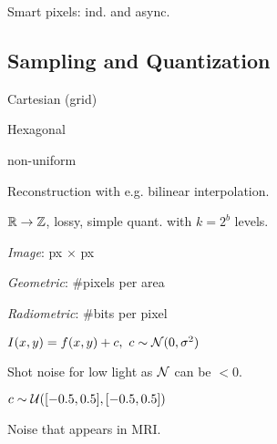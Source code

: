 \begin{definition}
  Smart pixels: ind. and async.
\end{definition}

\subsection{Sampling and Quantization}
\begin{definition}[Sampling]
  \begin{itemize*}
    \item Cartesian (grid)
    \item Hexagonal
    \item non-uniform
  \end{itemize*}

  Reconstruction with e.g. bilinear interpolation.
\end{definition}

\begin{definition}[Quantization]
  \(\operatorname{\mathbb{R}} \to \operatorname{\mathbb{Z}}\), lossy, simple quant. with \(k = 2^b\) levels.
\end{definition}

\begin{definition}[Resolutions]
  \begin{itemize*}
    \item \textit{Image}: px \(\times\) px
    \item \textit{Geometric}: \#pixels per area
    \item \textit{Radiometric}: \#bits per pixel
  \end{itemize*}
\end{definition}

\begin{definition}
  \(I(x, y) = f(x, y) + c, \ c \sim \operatorname{\mathcal{N}}(0, \sigma^2)\)
\end{definition}

\begin{definition}
  Shot noise for low light as \(\operatorname{\mathcal{N}}\) can be \(< 0\).
\end{definition}

\begin{definition}
  \(c \sim \operatorname{\mathcal{U}}([-0.5, 0.5], [-0.5, 0.5])\)
\end{definition}

\begin{definition}
  Noise that appears in MRI.
\end{definition}

